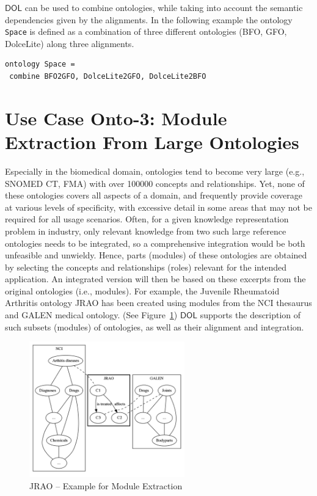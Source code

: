 \documentclass[10pt,fleqn,final]{scrreprt}
\newcommand*{\DOL}{\ensuremath{\mathsf{DOL}}\xspace}
\newcommand{\figurerefname}{Figure}
\newcommand{\fref}[1]{\figurerefname~\ref{#1}}
\begin{document}
 \DOL can be used to combine ontologies, while taking into account the semantic dependencies given by the alignments. In the following example the ontology \lstinline{Space} is defined as a combination of three different ontologies (BFO, GFO, DolceLite) along three alignments. 

 \begin{lstlisting}[basicstyle=\ttfamily\footnotesize,language=dolText,escapechar=@,mathescape]
      ontology Space =
 combine BFO2GFO, DolceLite2GFO, DolceLite2BFO
\end{lstlisting} 

\section{Use Case Onto-3: Module Extraction From Large Ontologies}\label{onto-3}
Especially in the biomedical domain, ontologies tend to become very large (e.g., SNOMED CT, FMA) 
with over 100000 concepts and relationships. Yet, none of these ontologies covers all aspects of a 
domain, and frequently provide coverage at various levels of specificity, with excessive detail in 
some areas that may not be required for all usage scenarios. Often, for a given knowledge 
representation problem in industry, only relevant knowledge from two such large reference 
ontologies needs to be integrated, so a comprehensive integration would be both unfeasible and 
unwieldy. Hence, parts (modules) of these ontologies are obtained by selecting the concepts and 
relationships (roles) relevant for the intended application. An integrated version will then be 
based on these excerpts from the original ontologies (i.e., modules). For example, the Juvenile 
Rheumatoid Arthritis ontology JRAO has been created using modules from the NCI thesaurus and GALEN 
medical ontology. (See \fref{JRAO}) \DOL  
supports the description of such subsets (modules) of ontologies, as well as their alignment and 
integration.


\begin{figure}[htbp]
\begin{center}
\includegraphics[width=0.6\textwidth]{useCaseOnto3.png}
\caption{JRAO  -- Example for Module Extraction}
\label{JRAO}
\end{center}
\end{figure}
\end{document}
